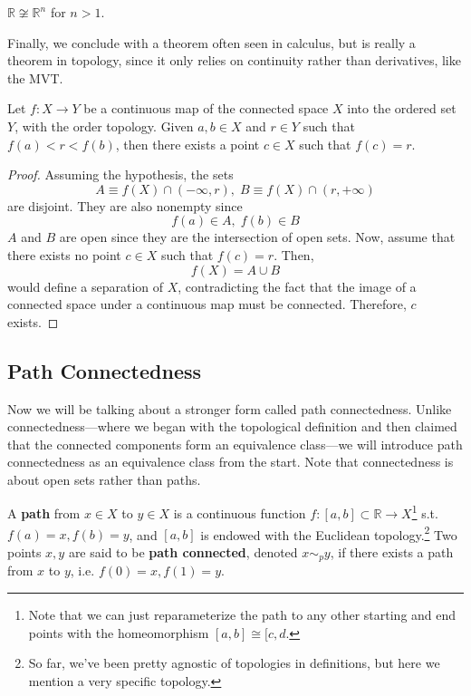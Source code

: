   \begin{corollary}
    $\mathbb{R} \not\cong \mathbb{R}^n$ for $n > 1$. 
  \end{corollary}

  Finally, we conclude with a theorem often seen in calculus, but is really a theorem in topology, since it only relies on continuity rather than derivatives, like the MVT. 

  \begin{theorem}
    Let $f: X \longrightarrow Y$ be a continuous map of the connected space $X$ into the ordered set $Y$, with the order topology. Given $a, b \in X$ and $r \in Y$ such that $f(a)<r<f(b)$, then there exists a point $c \in X$ such that $f(c) = r$. 
  \end{theorem}
  \begin{proof}
    Assuming the hypothesis, the sets 
    \begin{equation}
      A \equiv f(X) \cap (-\infty, r), \; B \equiv f(X) \cap (r, +\infty)
    \end{equation}
    are disjoint. They are also nonempty since 
    \begin{equation}
      f(a) \in A, \; f(b) \in B
    \end{equation}
    $A$ and $B$ are open since they are the intersection of open sets. Now, assume that there exists no point $c \in X$ such that $f(c) = r$. Then, 
    \begin{equation}
      f(X) = A \cup B
    \end{equation}
    would define a separation of $X$, contradicting the fact that the image of a connected space under a continuous map must be connected. Therefore, $c$ exists. 
  \end{proof}  

\subsection{Path Connectedness} 

  Now we will be talking about a stronger form called path connectedness. Unlike connectedness---where we began with the topological definition and then claimed that the connected components form an equivalence class---we will introduce path connectedness as an equivalence class from the start. Note that connectedness is about open sets rather than paths. 

  \begin{definition}[Path]
    A \textbf{path} from $x \in X$ to $y \in X$ is a continuous function $f: [a, b] \subset \mathbb{R} \rightarrow X$\footnote{Note that we can just reparameterize the path to any other starting and end points with the homeomorphism $[a, b] \cong [c, d$.} s.t. $f(a) = x, f(b) = y$, and $[a, b]$ is endowed with the Euclidean topology.\footnote{So far, we've been pretty agnostic of topologies in definitions, but here we mention a very specific topology.} Two points $x, y$ are said to be \textbf{path connected}, denoted $x \sim_p y$, if there exists a path from $x$ to $y$, i.e. $f(0) = x, f(1) = y$.
  \end{definition} 

